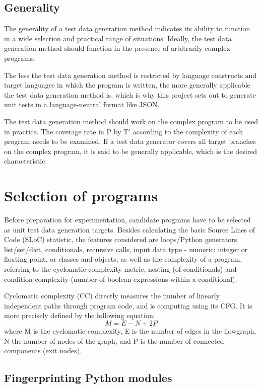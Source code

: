 \documentclass{icldt}
\numberwithin{equation}{section}       %
\begin{document}
{{\subsection{Generality}
The generality of a test data generation method indicates its ability to function in a wide selection and practical range of situations. Ideally, the test data generation method should function in the presence of arbitrarily complex programs.

The less the test data generation method is restricted by language constructs and target languages in which the program is written, the more generally applicable the test data generation method is, which is why this project sets out to generate unit tests in a language-neutral format like JSON.

The test data generation method should work on the complex program to be used in practice. The coverage rate in P by T' according to the complexity of each program needs to be examined. If a test data generator covers all target branches on the complex program, it is said to be generally applicable, which is the desired characteristic.

\section{Selection of programs}
Before preparation for experimentation, candidate programs have to be selected as unit test data generation targets. Besides calculating the basic Source Lines of Code (SLoC) statistic, the features considered are loops/Python generators, list/set/dict, conditionals, recursive calls, input data type - numeric: integer or floating point, or classes and objects, as well as the complexity of a program, referring to the cyclomatic complexity metric, nesting (of conditionals) and condition complexity (number of boolean expressions within a conditional).

Cyclomatic complexity (CC) directly measures the number of linearly independent paths through program code, and is computing using its CFG. It is more precisely defined by the following equation:
$$
	M = E - N + 2P
$$
where M is the cyclomatic complexity, E is the number of edges in the flowgraph, N the number of nodes of the graph, and P is the number of connected components (exit nodes).

\subsection{Fingerprinting Python modules}

}}
\end{document}
